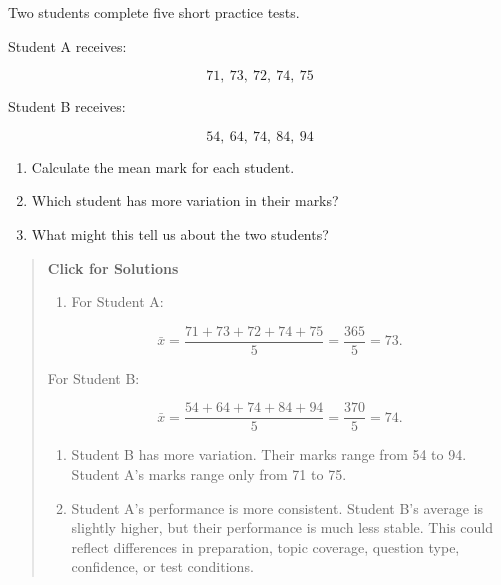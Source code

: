 \documentclass[
  letterpaper,
  DIV=11,
  numbers=noendperiod]{scrreprt}
\providecommand{\tightlist}{%
  \setlength{\itemsep}{0pt}\setlength{\parskip}{0pt}}
\begin{document}
\begin{tcolorbox}[enhanced jigsaw, arc=.35mm, bottomrule=.15mm, bottomtitle=1mm, breakable, colback=white, colbacktitle=quarto-callout-note-color!10!white, colframe=quarto-callout-note-color-frame, coltitle=black, left=2mm, leftrule=.75mm, opacityback=0, opacitybacktitle=0.6, rightrule=.15mm, title=\textcolor{quarto-callout-note-color}{\faInfo}\hspace{0.5em}{Question 6}, titlerule=0mm, toprule=.15mm, toptitle=1mm]

Two students complete five short practice tests.

Student A receives:

\[
71,\ 73,\ 72,\ 74,\ 75
\]

Student B receives:

\[
54,\ 64,\ 74,\ 84,\ 94
\]

\begin{enumerate}
\def\labelenumi{\alph{enumi}.}
\item
  Calculate the mean mark for each student.
\item
  Which student has more variation in their marks?
\item
  What might this tell us about the two students?
\end{enumerate}

\begin{quote}
\textbf{Click for Solutions}

\begin{enumerate}
\def\labelenumi{\alph{enumi}.}
\tightlist
\item
  For Student A:
\end{enumerate}

\[
\bar{x}
=
\frac{71 + 73 + 72 + 74 + 75}{5}
=
\frac{365}{5}
=
73.
\]

For Student B:

\[
\bar{x}
=
\frac{54 + 64 + 74 + 84 + 94}{5}
=
\frac{370}{5}
=
74.
\]

\begin{enumerate}
\def\labelenumi{\alph{enumi}.}
\setcounter{enumi}{1}
\item
  Student B has more variation. Their marks range from 54 to 94. Student
  A's marks range only from 71 to 75.
\item
  Student A's performance is more consistent. Student B's average is
  slightly higher, but their performance is much less stable. This could
  reflect differences in preparation, topic coverage, question type,
  confidence, or test conditions.
\end{enumerate}
\end{quote}

\end{tcolorbox}
\end{document}
